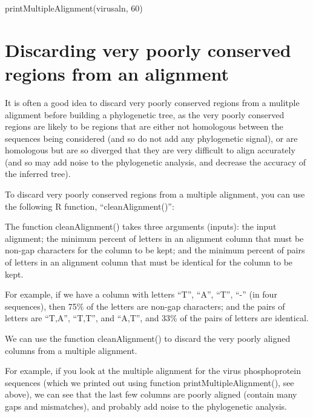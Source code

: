 \documentclass[
]{book}
\newenvironment{Shaded}{\begin{snugshade}}{\end{snugshade}}
\newcommand{\DecValTok}[1]{\textcolor[rgb]{0.00,0.00,0.81}{#1}}
\newcommand{\FunctionTok}[1]{\textcolor[rgb]{0.00,0.00,0.00}{#1}}
\newcommand{\NormalTok}[1]{#1}
\begin{document}
\begin{Shaded}
\begin{Highlighting}[]
\FunctionTok{printMultipleAlignment}\NormalTok{(virusaln, }\DecValTok{60}\NormalTok{)}
\end{Highlighting}
\end{Shaded}

\hypertarget{discarding-very-poorly-conserved-regions-from-an-alignment}{%
\section{Discarding very poorly conserved regions from an alignment}\label{discarding-very-poorly-conserved-regions-from-an-alignment}}

It is often a good idea to discard very poorly conserved regions from a mulitple alignment before building a phylogenetic tree, as the very poorly conserved regions are likely to be regions that are either not homologous between the sequences being considered (and so do not add any phylogenetic signal), or are homologous but are so diverged that they are very difficult to align accurately (and so may add noise to the phylogenetic analysis, and decrease the accuracy of the inferred tree).

To discard very poorly conserved regions from a multiple alignment, you can use the following R function, ``cleanAlignment()'':

The function cleanAlignment() takes three arguments (inputs): the input alignment; the minimum percent of letters in an alignment column that must be non-gap characters for the column to be kept; and the minimum percent of pairs of letters in an alignment column that must be identical for the column to be kept.

For example, if we have a column with letters ``T'', ``A'', ``T'', ``-'' (in four sequences), then 75\% of the letters are non-gap characters; and the pairs of letters are ``T,A'', ``T,T'', and ``A,T'', and 33\% of the pairs of letters are identical.

We can use the function cleanAlignment() to discard the very poorly aligned columns from a multiple alignment.

For example, if you look at the multiple alignment for the virus phosphoprotein sequences (which we printed out using function printMultipleAlignment(), see above), we can see that the last few columns are poorly aligned (contain many gaps and mismatches), and probably add noise to the phylogenetic analysis.
\end{document}
